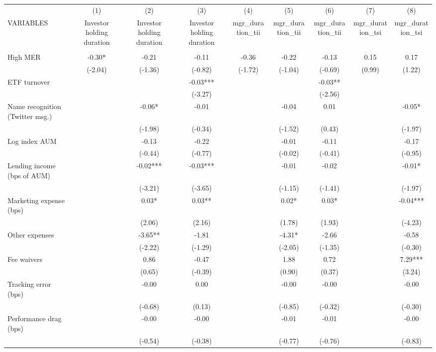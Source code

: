 \documentclass[]{article}
\begin{document}
\begin{tabular}{lcccccccc} \hline
 & (1) & (2) & (3) & (4) & (5) & (6) & (7) & (8) \\
VARIABLES & Investor holding duration & Investor holding duration & Investor holding duration & mgr\_duration\_tii & mgr\_duration\_tii & mgr\_duration\_tii & mgr\_duration\_tsi & mgr\_duration\_tsi \\ \hline
 &  &  &  &  &  &  &  &  \\
High MER & -0.30* & -0.21 & -0.11 & -0.36 & -0.22 & -0.13 & 0.15 & 0.17 \\
 & (-2.04) & (-1.36) & (-0.82) & (-1.72) & (-1.04) & (-0.69) & (0.99) & (1.22) \\
ETF turnover &  &  & -0.03*** &  &  & -0.03** &  &  \\
 &  &  & (-3.27) &  &  & (-2.56) &  &  \\
Name recognition (Twitter msg.) &  & -0.06* & -0.01 &  & -0.04 & 0.01 &  & -0.05* \\
 &  & (-1.98) & (-0.34) &  & (-1.52) & (0.43) &  & (-1.97) \\
Log index AUM &  & -0.13 & -0.22 &  & -0.01 & -0.11 &  & -0.17 \\
 &  & (-0.44) & (-0.77) &  & (-0.02) & (-0.41) &  & (-0.95) \\
Lending income (bps of AUM) &  & -0.02*** & -0.03*** &  & -0.01 & -0.02 &  & -0.01* \\
 &  & (-3.21) & (-3.65) &  & (-1.15) & (-1.41) &  & (-1.97) \\
Marketing expense (bps) &  & 0.03* & 0.03** &  & 0.02* & 0.03* &  & -0.04*** \\
 &  & (2.06) & (2.16) &  & (1.78) & (1.93) &  & (-4.23) \\
Other expenses &  & -3.65** & -1.81 &  & -4.31* & -2.66 &  & -0.58 \\
 &  & (-2.22) & (-1.29) &  & (-2.05) & (-1.35) &  & (-0.30) \\
Fee waivers &  & 0.86 & -0.47 &  & 1.88 & 0.72 &  & 7.29*** \\
 &  & (0.65) & (-0.39) &  & (0.90) & (0.37) &  & (3.24) \\
Tracking error (bps) &  & -0.00 & 0.00 &  & -0.00 & -0.00 &  & -0.00 \\
 &  & (-0.68) & (0.13) &  & (-0.85) & (-0.32) &  & (-0.30) \\
Performance drag (bps) &  & -0.00 & -0.00 &  & -0.01 & -0.01 &  & -0.00 \\
 &  & (-0.54) & (-0.38) &  & (-0.77) & (-0.76) &  & (-0.83) \\

\end{tabular}
\end{document}

